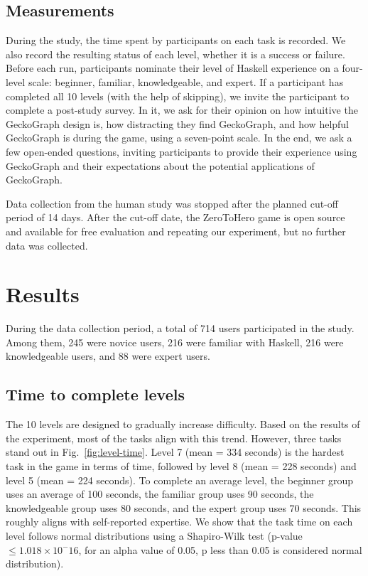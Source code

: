 \subsection{Measurements}
During the study, the time spent by participants on each task is recorded. We also record the resulting status of each level, whether it is a success or failure. Before each run, participants nominate their level of Haskell experience on a four-level scale: beginner, familiar,  knowledgeable, and expert.  If a participant has completed all 10 levels (with the help of skipping), we invite the participant to complete a post-study survey. In it, we ask for their opinion on how intuitive the GeckoGraph design is, how distracting they find GeckoGraph, and how helpful GeckoGraph is during the game, using a seven-point scale. In the end, we ask a few open-ended questions, inviting participants to provide their experience using GeckoGraph and their expectations about the potential applications of GeckoGraph.

Data collection from the human study was stopped after the planned cut-off period of 14 days. After the cut-off date, the ZeroToHero game is open source and available for free evaluation \cite{Fu2023-ne} and repeating our experiment, but no further data was collected. 

\section{Results}

During the data collection period, a total of 714 users participated in the study. Among them, 245 were novice users, 216 were familiar with Haskell, 216 were knowledgeable users, and 88 were expert users. 


\subsection{Time to complete levels}

The 10 levels are designed to gradually increase difficulty. Based on the results of the experiment, most of the tasks align with this trend. However, three tasks stand out in Fig.~\ref{fig:level-time}.  Level 7 (mean = 334 seconds) is the hardest task in the game in terms of time, followed by level 8 (mean = 228 seconds) and level 5 (mean = 224 seconds). To complete an average level, the beginner group uses an average of 100 seconds, the familiar group uses 90 seconds, the knowledgeable group uses 80 seconds, and the expert group uses 70 seconds. This roughly aligns with self-reported expertise. We show that the task time on each level follows normal distributions using a Shapiro-Wilk test \cite{Shaphiro1965-dx} (p-value  $ \leq 1.018 \times 10^-16$, for an alpha value of 0.05, p less than 0.05 is considered normal distribution).

